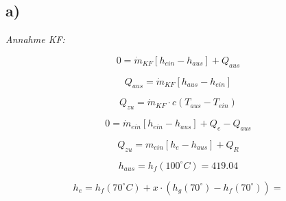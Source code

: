 

\subsection*{a)}

\textit{Annahme KF:}

\[
0 = \dot{m}_{KF} \left[ h_{ein} - h_{aus} \right] + Q_{aus}
\]

\[
Q_{aus} = \dot{m}_{KF} \left[ h_{aus} - h_{ein} \right]
\]

\[
Q_{zu} = \dot{m}_{KF} \cdot c \left( T_{aus} - T_{ein} \right)
\]

\[
0 = \dot{m}_{ein} \left[ h_{ein} - h_{aus} \right] + Q_{e} - Q_{aus}
\]

\[
Q_{zu} = m_{ein} \left[ h_{e} - h_{aus} \right] + Q_{R}
\]

\[
h_{aus} = h_{f} \left( 100^\circ C \right) = 419.04
\]

\[
h_{e} = h_{f} \left( 70^\circ C \right) + x \cdot \left( h_{g} \left( 70^\circ \right) - h_{f} \left( 70^\circ \right) \right) =
\]